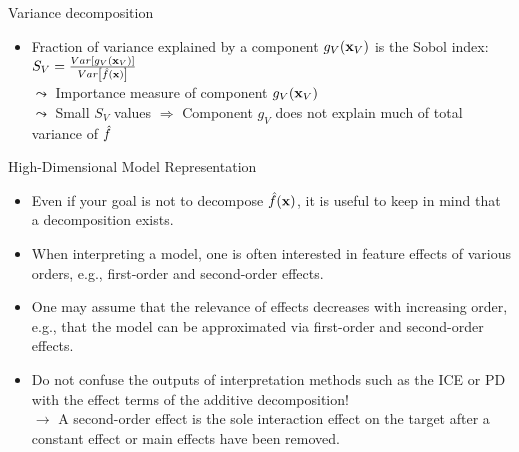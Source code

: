 \documentclass[11pt,compress,t,notes=noshow, aspectratio=169, xcolor=table]{beamer}
\newcommand{\open}{}
\newcommand{\close}{}
\begin{document}
\begin{frame}{Variance decomposition}
\begin{itemize}[<+->]
\item Fraction of variance explained by a component $g_{\open V \close}(\xv_V)$ is the Sobol index:
$
S_V = \frac{Var\left[g_{\open V \close}(\xv_V)\right]}{Var\left[\hat{f}(\xv)\right]}
$\\
$\leadsto$ Importance measure of component $g_{\open V \close}(\xv_V)$\\
$\leadsto$ Small $S_V$ values $\Rightarrow$ Component $g_{\open V \close}$ does not explain much of total variance of $\hat{f}$
\end{itemize}

\end{frame}


\begin{frame}{High-Dimensional Model Representation}

\begin{itemize}
\itemsep1em
    \item Even if your goal is not to decompose $\hat{f}(\mathbf{x})$, it is useful to keep in mind that a decomposition exists.
    \item When interpreting a model, one is often interested in feature effects of various orders, e.g., first-order and second-order effects.
    \item One may assume that the relevance of effects decreases with increasing order, e.g., that the model can be approximated via first-order and second-order effects.
    \item Do not confuse the outputs of interpretation methods such as the ICE or PD with the effect terms of the additive decomposition!
    \\$\rightarrow$ A second-order effect is the sole interaction effect on the target after a constant effect or main effects have been removed.
\end{itemize}
\end{frame}


\endlecture
\end{document}
